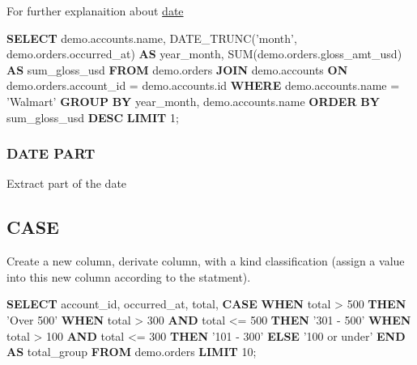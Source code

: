 \documentclass[]{book}
\newenvironment{Shaded}{\begin{snugshade}}{\end{snugshade}}
\newcommand{\KeywordTok}[1]{\textcolor[rgb]{0.13,0.29,0.53}{\textbf{#1}}}
\newcommand{\DecValTok}[1]{\textcolor[rgb]{0.00,0.00,0.81}{#1}}
\newcommand{\StringTok}[1]{\textcolor[rgb]{0.31,0.60,0.02}{#1}}
\newcommand{\FunctionTok}[1]{\textcolor[rgb]{0.00,0.00,0.00}{#1}}
\newcommand{\NormalTok}[1]{#1}
\begin{document}
For further explanaition about
\href{https://blog.modeanalytics.com/date-trunc-sql-timestamp-function-count-on/}{date}

\begin{Shaded}
\begin{Highlighting}[]
\KeywordTok{SELECT}\NormalTok{ demo.accounts.name,}
\NormalTok{       DATE_TRUNC(}\StringTok{'month'}\NormalTok{, demo.orders.occurred_at) }\KeywordTok{AS}\NormalTok{ year_month,}
       \FunctionTok{SUM}\NormalTok{(demo.orders.gloss_amt_usd) }\KeywordTok{AS}\NormalTok{ sum_gloss_usd}
\KeywordTok{FROM}\NormalTok{ demo.orders}
\KeywordTok{JOIN}\NormalTok{ demo.accounts}
\KeywordTok{ON}\NormalTok{ demo.orders.account_id = demo.accounts.id}
\KeywordTok{WHERE}\NormalTok{ demo.accounts.name = }\StringTok{'Walmart'}
\KeywordTok{GROUP} \KeywordTok{BY}\NormalTok{ year_month, demo.accounts.name}
\KeywordTok{ORDER} \KeywordTok{BY}\NormalTok{ sum_gloss_usd }\KeywordTok{DESC}
\KeywordTok{LIMIT} \DecValTok{1}\NormalTok{;}
\end{Highlighting}
\end{Shaded}

\subsubsection{DATE PART}\label{date-part}

Extract part of the date

\subsection{CASE}\label{case}

Create a new column, derivate column, with a kind classification (assign
a value into this new column according to the statment).

\begin{Shaded}
\begin{Highlighting}[]
\KeywordTok{SELECT}\NormalTok{ account_id,}
\NormalTok{       occurred_at,}
\NormalTok{       total,}
       \KeywordTok{CASE} \KeywordTok{WHEN}\NormalTok{ total > }\DecValTok{500} \KeywordTok{THEN} \StringTok{'Over 500'}
            \KeywordTok{WHEN}\NormalTok{ total > }\DecValTok{300} \KeywordTok{AND}\NormalTok{ total <= }\DecValTok{500} \KeywordTok{THEN} \StringTok{'301 - 500'}
            \KeywordTok{WHEN}\NormalTok{ total > }\DecValTok{100} \KeywordTok{AND}\NormalTok{ total <= }\DecValTok{300} \KeywordTok{THEN} \StringTok{'101 - 300'}
            \KeywordTok{ELSE} \StringTok{'100 or under'} \KeywordTok{END} \KeywordTok{AS}\NormalTok{ total_group}
\KeywordTok{FROM}\NormalTok{ demo.orders}
\KeywordTok{LIMIT} \DecValTok{10}\NormalTok{;}
\end{Highlighting}
\end{Shaded}
\end{document}
